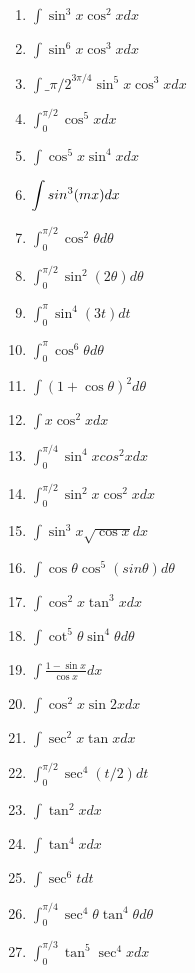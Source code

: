 \documentclass[12pt,]{article}
\begin{document}
\begin{enumerate}
\def\labelenumi{\arabic{enumi}.}
\item
  \(\displaystyle\int\sin^3x\cos^2xdx\)
\item
  \(\displaystyle\int\sin^6x\cos^3xdx\)
\item
  \(\displaystyle\int\_{\pi/2}^{3\pi/4}\sin^5x\cos^3xdx\)
\item
  \(\displaystyle\int_0^{\pi/2}\cos^5xdx\)
\item
  \(\displaystyle\int\cos^5x\sin^4xdx\)
\item
  \(\displaystyle\int\\sin^3(mx)dx\)
\item
  \(\displaystyle\int_0^{\pi/2}\cos^2\theta d\theta\)
\item
  \(\displaystyle\int_0^{\pi/2}\sin^2(2\theta)d\theta\)
\item
  \(\displaystyle\int_0^{\pi}\sin^4(3t)dt\)
\item
  \(\displaystyle\int_0^{\pi}\cos^6\theta d\theta\)
\item
  \(\displaystyle\int(1+\cos\theta)^2d\theta\)
\item
  \(\displaystyle\int x\cos^2xdx\)
\item
  \(\displaystyle\int_0^{\pi/4}\sin^4xcos^2xdx\)
\item
  \(\displaystyle\int_0^{\pi/2}\sin^2x\cos^2xdx\)
\item
  \(\displaystyle\int\sin^3x\sqrt{\cos x}dx\)
\item
  \(\displaystyle\int\cos\theta\cos^5(sin \theta)d\theta\)
\item
  \(\displaystyle\int\cos^2x\tan^3xdx\)
\item
  \(\displaystyle\int\cot^5\theta\sin^4\theta d\theta\)
\item
  \(\displaystyle\int\frac{1-\sin x}{\cos x }dx\)
\item
  \(\displaystyle\int\cos^2 x\sin 2xdx\)
\item
  \(\displaystyle\int\sec^2x\tan x dx\)
\item
  \(\displaystyle\int_0^{\pi/2}\sec^4(t/2)dt\)
\item
  \(\displaystyle\int\tan^2xdx\)
\item
  \(\displaystyle\int\tan^4xdx\)
\item
  \(\displaystyle\int\sec^6tdt\)
\item
  \(\displaystyle\int_0^{\pi/4}\sec^4\theta\tan^4\theta d\theta\)
\item
  \(\displaystyle\int_0^{\pi/3}\tan^5\sec^4xdx\)

\end{enumerate}
\end{document}
